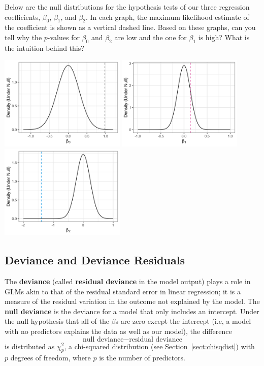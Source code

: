 \begin{question}{}
Below are the null distributions for the hypothesis tests of our three regression coefficients, $\beta_0$, $\beta_1$, and $\beta_2$. In each graph, the maximum likelihood estimate of the coefficient is shown as a vertical dashed line. Based on these graphs, can you tell why the $p$-values for $\beta_0$ and $\beta_2$ are low and the one for $\beta_1$ is high? What is the intuition behind this?
\begin{center}
\includegraphics[width=0.45\textwidth]{img/logreg-example-beta-0.png}
\includegraphics[width=0.45\textwidth]{img/logreg-example-beta-1.png}
\includegraphics[width=0.45\textwidth]{img/logreg-example-beta-2.png}
\end{center}
\end{question}

\subsection{Deviance and Deviance Residuals}

The \textbf{deviance} (called \textbf{residual deviance} in the model output) plays a role in GLMs akin to that of the residual standard error in linear regression; it is a measure of the residual variation in the outcome not explained by the model. The \textbf{null deviance} is the deviance for a model that only includes an intercept. Under the null hypothesis that all of the $\beta$s are zero except the intercept (i.e, a model with no predictors explains the data as well as our model), the difference
$$ \text{null deviance} - \text{residual deviance} $$
is distributed as $\chi^2_p$, a chi-squared distribution (see Section~\ref{sect:chisqdist}) with $p$ degrees of freedom, where $p$ is the number of predictors.
\vspace{5mm}

